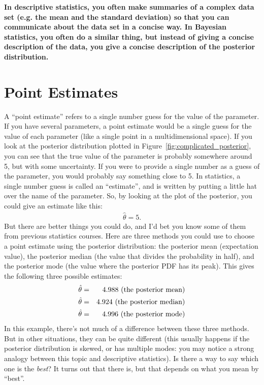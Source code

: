 \begin{framed}
{\bf In descriptive statistics, you often make summaries of a complex data set
(e.g. the mean and the standard deviation) so that you can communicate about
the data set in a concise way. In Bayesian statistics, you often do a similar
thing, but instead of giving a concise description of the data, you give a
concise description of the posterior distribution.}
\end{framed}

\section{Point Estimates}
A ``point estimate'' refers to a single number guess for the value of the parameter.
If you have several parameters, a point estimate would be a single guess for the
value of each parameter (like a single point in a multidimensional space).
If you look at the
posterior distribution plotted in Figure~\ref{fig:complicated_posterior}, you
can see that the true value of the parameter is probably somewhere around 5,
but with some uncertainty. If you were to provide a single number as a guess of
the parameter, you would probably say something close to 5. In statistics, a
single number guess is called an ``estimate'', and is written by putting a
little hat over the name of the parameter. So, by looking at the plot of the
posterior, you could give an estimate like this:
\begin{eqnarray}
\hat{\theta} = 5.
\end{eqnarray}
But there are better things you could do, and I'd bet you know some of them
from previous statistics courses. Here are three methods you could use to
choose a point estimate using the posterior distribution: the posterior mean
(expectation value), the posterior median (the value that divides the probability
in half), and the posterior mode (the value where the posterior PDF has its
peak). This gives the following three possible estimates:
\begin{eqnarray}
\hat{\theta} &=& 4.988 \textnormal{ (the posterior mean)}\\
\hat{\theta} &=& 4.924 \textnormal{ (the posterior median)}\\
\hat{\theta} &=& 4.996 \textnormal{ (the posterior mode)}
\end{eqnarray}
In this example, there's not much of a difference between these three methods.
But in other situations, they can be quite different (this usually happens if
the posterior distribution is skewed, or has multiple modes: you may notice a
strong analogy between this topic and descriptive statistics). Is there a way
to say which one is the {\it best}? It turns out that there is, but that
depends on what you mean by ``best''.

